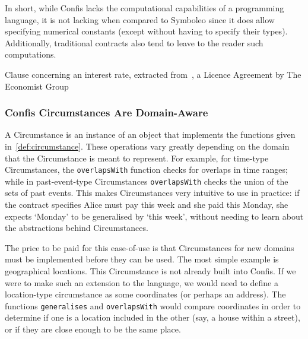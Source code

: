 In short, while Confis lacks the computational capabilities of a programming language, it is not lacking when compared to Symboleo since it does allow specifying numerical constants (except without having to specify their types).
Additionally, traditional contracts also tend to leave to the reader such computations.

\begin{table}[h]
    \centering
    \setlength{\fboxsep}{10pt}
    \caption[The Econoimist licence interest rate clause]{Clause concerning an interest rate, extracted from~\cite{economistIU2016licence}, a Licence Agreement by The Economist Group}
    \label{tab:economist-interest}
\end{table}

\subsubsection{Confis Circumstances Are Domain-Aware}
\label{subsubsec:limits-domain-circumstances}

A Circumstance is an instance of an object that implements the functions given in~\autoref{def:circumstance}.
These operations vary greatly depending on the domain that the Circumstance is meant to represent.
For example, for time-type Circumstances, the \texttt{overlapsWith} function checks for overlaps in time ranges;
while in past-event-type Circumstances \texttt{overlapsWith} checks the union of the sets of past events.
This makes Circumstances very intuitive to use in practice: if the contract specifies Alice must pay this week and she paid this Monday, she expects `Monday' to be generalised by `this week', without needing to learn about the abstractions behind Circumstances.


The price to be paid for this ease-of-use is that Circumstances for new domains must be implemented before they can be used.
The most simple example is geographical locations.
This Circumstance is not already built into Confis.
If we were to make such an extension to the language, we would need to define a location-type circumstance as some coordinates (or perhaps an address).
The functions \texttt{generalises} and \texttt{overlapsWith} would compare coordinates in order to determine if one is a location included in the other (say, a house within a street), or if they are close enough to be the same place.

